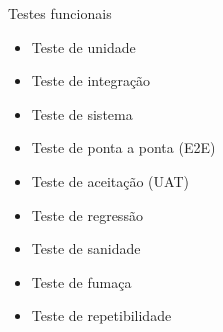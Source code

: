 
\begin{frame}{Testes funcionais}
    \begin{itemize}
        \item Teste de unidade
        \item Teste de integração
        \item Teste de sistema
        \item Teste de ponta a ponta (E2E)
        \item Teste de aceitação (UAT)
        \item Teste de regressão
        \item Teste de sanidade
        \item Teste de fumaça
        \item Teste de repetibilidade
    \end{itemize}
\end{frame}